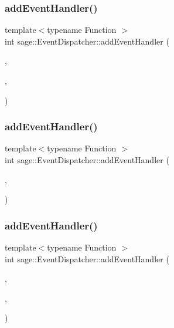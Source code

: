 \subsubsection{\texorpdfstring{addEventHandler()}{addEventHandler()}\hspace{0.1cm}{\footnotesize\ttfamily [1/3]}}
{\footnotesize\ttfamily template$<$typename Function $>$ \\
int sage\+::\+Event\+Dispatcher\+::add\+Event\+Handler (\begin{DoxyParamCaption}\item[{\mbox{\hyperlink{namespacesage_afe706a25026cc74fe69b56d53a265d29}{Event}}}]{,  }\item[{\mbox{\hyperlink{classsage_1_1Scene}{Scene}} \&}]{,  }\item[{Function \&\&}]{ }\end{DoxyParamCaption})}

\mbox{\label{classsage_1_1EventDispatcher_a0f27316ccad82d3b7697dd835964741d}} 
\subsubsection{\texorpdfstring{addEventHandler()}{addEventHandler()}\hspace{0.1cm}{\footnotesize\ttfamily [2/3]}}
{\footnotesize\ttfamily template$<$typename Function $>$ \\
int sage\+::\+Event\+Dispatcher\+::add\+Event\+Handler (\begin{DoxyParamCaption}\item[{\mbox{\hyperlink{namespacesage_afe706a25026cc74fe69b56d53a265d29}{Event}}}]{,  }\item[{Function \&\&}]{ }\end{DoxyParamCaption})}

\mbox{\label{classsage_1_1EventDispatcher_ac7121d7fde0bd5bd5e1be07f5c41a45f}} 
\subsubsection{\texorpdfstring{addEventHandler()}{addEventHandler()}\hspace{0.1cm}{\footnotesize\ttfamily [3/3]}}
{\footnotesize\ttfamily template$<$typename Function $>$ \\
int sage\+::\+Event\+Dispatcher\+::add\+Event\+Handler (\begin{DoxyParamCaption}\item[{\mbox{\hyperlink{namespacesage_ad2c7b0e1ebf67f572d43620e6b07aa13}{Node\+Event}}}]{,  }\item[{\mbox{\hyperlink{classsage_1_1Node}{Node}} \&}]{,  }\item[{Function \&\&}]{ }\end{DoxyParamCaption})}

